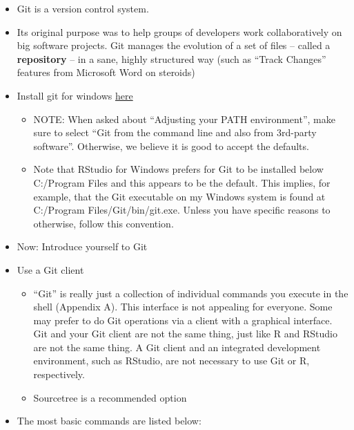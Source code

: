 \documentclass[
]{article}
\providecommand{\tightlist}{%
  \setlength{\itemsep}{0pt}\setlength{\parskip}{0pt}}
\begin{document}
\begin{itemize}
\item
  Git is a version control system.
\item
  Its original purpose was to help groups of developers work
  collaboratively on big software projects. Git manages the evolution
  of a set of files -- called a \textbf{repository} -- in a sane, highly
  structured way (such as ``Track Changes'' features from Microsoft Word
  on steroids)
\item
  Install git for windows \href{https://gitforwindows.org/}{here}

  \begin{itemize}
  \tightlist
  \item
    NOTE: When asked about ``Adjusting your PATH environment'', make
    sure to select ``Git from the command line and also from
    3rd-party software''. Otherwise, we believe it is good to accept
    the defaults.
  \item
    Note that RStudio for Windows prefers for Git to be installed
    below C:/Program Files and this appears to be the default. This
    implies, for example, that the Git executable on my Windows
    system is found at C:/Program Files/Git/bin/git.exe. Unless you
    have specific reasons to otherwise, follow this convention.
  \end{itemize}
\item
  Now: Introduce yourself to Git
\item
  Use a Git client

  \begin{itemize}
  \tightlist
  \item
    ``Git'' is really just a collection of individual commands you
    execute in the shell (Appendix A). This interface is not
    appealing for everyone. Some may prefer to do Git operations via
    a client with a graphical interface. Git and your Git client are
    not the same thing, just like R and RStudio are not the same
    thing. A Git client and an integrated development environment,
    such as RStudio, are not necessary to use Git or R,
    respectively.
  \item
    Sourcetree is a recommended option
  \end{itemize}
\item
  The most basic commands are listed below:


\end{itemize}
\end{document}
